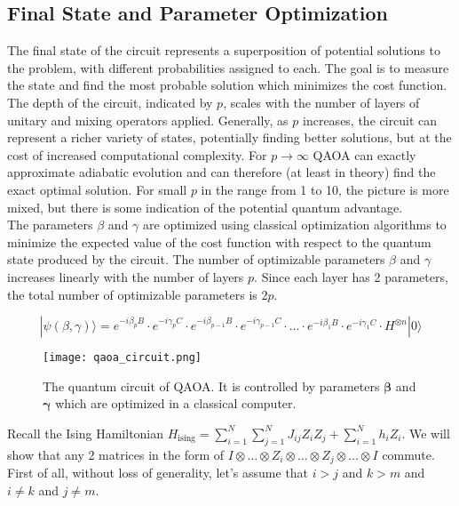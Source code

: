\documentclass[12pt,a4paper]{report}
\begin{document}
\subsection*{Final State and Parameter Optimization}
    
The final state of the circuit represents a superposition of potential solutions to the problem, with different probabilities assigned to each. The goal is to measure the state and find the most probable solution which minimizes the cost function.
\\

\noindent
The depth of the circuit, indicated by \( p \), scales with the number of layers of unitary and mixing operators applied. Generally, as \( p \) increases, the circuit can represent a richer variety of states, potentially finding better solutions, but at the cost of increased computational complexity. For \( p \to \infty \) QAOA can exactly approximate adiabatic evolution and can therefore (at least in theory) find the exact optimal solution. For small \( p \) in the range from 1 to 10, the picture is more mixed, but there is some indication of the potential quantum advantage.
\\

\newpage
\noindent
The parameters \( \beta \) and \( \gamma \) are optimized using classical optimization algorithms to minimize the expected value of the cost function with respect to the quantum state produced by the circuit. The number of optimizable parameters \( \beta \) and \( \gamma \) increases linearly with the number of layers \( p \). Since each layer has 2 parameters, the total number of optimizable parameters is \( 2p \).

\begin{equation}
| \psi(\beta, \gamma) \rangle = e^{-i \beta_p B} \cdot e^{-i \gamma_p C} \cdot e^{-i \beta_{p-1} B} \cdot e^{-i \gamma_{p-1} C} \cdot \ldots \cdot e^{-i \beta_1 B} \cdot e^{-i \gamma_1 C} \cdot H^{\otimes n} |0\rangle
\end{equation}



\begin{figure}[h]
    \centering
    \texttt{[image: qaoa\_circuit.png]}
    \caption{The quantum circuit of QAOA. It is controlled by parameters \(\mathbf{\beta}\) and \(\mathbf{\gamma}\) which are optimized in a classical computer.
}
    \label{fig:qaoa_circuit}
\end{figure}

\noindent
Recall the Ising Hamiltonian $H_{\text{ising}} = \sum_{i=1}^{N} \sum_{j=1}^{N} J_{ij} Z_i Z_j + \sum_{i=1}^{N} h_i Z_i$. We will show that any 2 matrices in the form of $I \otimes \ldots \otimes Z_i \otimes \ldots \otimes Z_j \otimes \ldots \otimes I$ commute. First of all, without loss of generality, let's assume that $i > j$ and $k > m$ and $i \neq k$ and $j \neq m$.
\end{document}
